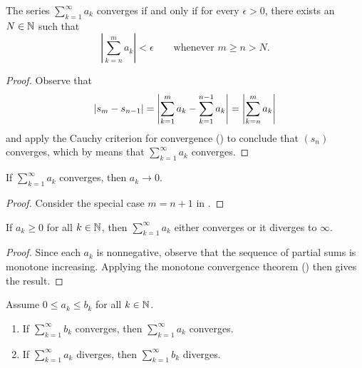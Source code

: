 \begin{theorem}
  The series $\sum_{k = 1}^{\infty} a_k$ converges if and only if for
  every $\epsilon > 0$, there exists an $N \in \mathbb N$ such that
  \[ \left|\sum_{k = n}^{m} a_k\right| < \epsilon \qquad
  \text{whenever $m \geq n > N$.}\]
\end{theorem}

\begin{proof}
  Observe that
  \[ | s_m - s_{n - 1} | = \left|\sum_{k = 1}^{m} a_k - \sum_{k =
  1}^{n - 1} a_k\right| = \left|\sum_{k = n}^{m} a_k\right| \]
  and apply the Cauchy criterion for convergence
  () to conclude that
  $(s_n)$ converges, which by 
  means that $\sum_{k = 1}^{\infty} a_k$ converges.
\end{proof}

\begin{theorem}
  If $\sum_{k = 1}^{\infty} a_k$ converges, then $a_k \to 0$.
\end{theorem}

\begin{proof}
  Consider the special case $m = n + 1$ in .
\end{proof}

\begin{lemma}
  If $a_k \geq 0$ for all $k \in \mathbb N$, then $\sum_{k = 1}^{\infty}
  a_k$ either converges or it diverges to $\infty$.
\end{lemma}

\begin{proof}
  Since each $a_k$ is nonnegative, observe that the sequence of
  partial sums is monotone increasing. Applying the monotone
  convergence theorem () then gives the result.
\end{proof}

\begin{proposition}
  Assume $0 \leq a_k \leq b_k$ for all $k \in \mathbb N$.
  \begin{enumerate}
    \item If $\sum_{k = 1}^{\infty} b_k$ converges, then $\sum_{k =
      1}^{\infty} a_k$ converges.
    \item If $\sum_{k = 1}^{\infty} a_k$ diverges, then $\sum_{k =
      1}^{\infty} b_k$ diverges.
  \end{enumerate}
\end{proposition}

